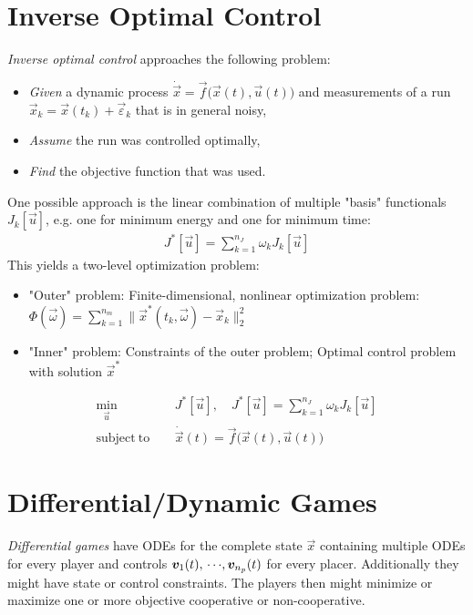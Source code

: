	\section{Inverse Optimal Control}
		\emph{Inverse optimal control} approaches the following problem:
		\begin{itemize}
			\item \emph{Given} a dynamic process \( \dot{\vec{x}} = \vec{f}\big(\vec{x}(t), \vec{u}(t)\big) \) and measurements of a run \( \vec{x}_k = \vec{x}(t_k) + \vec{\varepsilon}_k \) that is in general noisy,
			\item \emph{Assume} the run was controlled optimally,
			\item \emph{Find} the objective function that was used.
		\end{itemize}

		One possible approach is the linear combination of multiple "basis" functionals \( J_k[\vec{u}] \), e.g. one for minimum energy and one for minimum time:
		\begin{align*}
			J^\ast[\vec{u}] = \sum_{k = 1}^{n_J} \omega_k J_k[\vec{u}]
		\end{align*}
		This yields a two-level optimization problem:
		\begin{itemize}
			\item "Outer" problem: Finite-dimensional, nonlinear optimization problem: \( \Phi(\vec{\omega}) = \sum_{k = 1}^{n_m} \lVert \vec{x}^\ast(t_k, \vec{\omega}) - \vec{x}_k \rVert_2^2 \)
			\item "Inner" problem: Constraints of the outer problem; Optimal control problem with solution \( \vec{x}^\ast \)
		\end{itemize}
		\begin{align*}
			\min_{\vec{u}} &\, J^\ast[\vec{u}],\quad J^\ast[\vec{u}] = \sum_{k = 1}^{n_J} \omega_k J_k[\vec{u}] \\
			\mathrm{subject~to}\quad &\,
				\dot{\vec{x}}(t) = \vec{f}\big(\vec{x}(t), \vec{u}(t)\big)
		\end{align*}

	\section{Differential/Dynamic Games}
		\emph{Differential games} have ODEs for the complete state \( \vec{x} \) containing multiple ODEs for every player and controls \( \bm{v}_1(t),\,\cdots\!,\bm{v}_{n_p}(t) \) for every placer. Additionally they might have state or control constraints. The players then might minimize or maximize one or more objective cooperative or non-cooperative.

